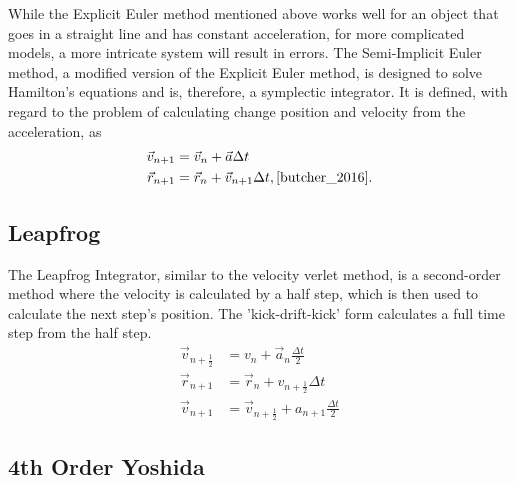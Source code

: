 While the Explicit Euler method mentioned above works well for an object that goes in a straight line and has constant acceleration, for more complicated models, a more intricate system will result in errors. The Semi-Implicit Euler method, a modified version of the Explicit Euler method, is designed to solve Hamilton's equations and is, therefore, a symplectic integrator. It is defined, with regard to the problem of calculating change position and velocity from the acceleration, as  
\begin{align*}
\vec{v}_{n+1}&=\vec{v}_n+\vec{a} \Delta t\\
\vec{r}_{n+1}&=\vec{r}_n+\vec{v}_{n+1} \Delta t, \cite{butcher_2016}.
\end{align*}

\subsection{Leapfrog}

The Leapfrog Integrator, similar to the velocity verlet method, is a second-order method where the velocity is calculated by a half step, which is then used to calculate the next step's position. The 'kick-drift-kick' form calculates a full time step from the half step.
\begin{align*}
\vec{v}_{n+\frac{1}{2}}&=v_n+\vec{a}_n \frac{\Delta t}{2}\\
\vec{r}_{n+1}&=\vec{r}_n+v_{n+\frac{1}{2}} \Delta t\\
\vec{v}_{n+1}&=\vec{v}_{n+\frac{1}{2}}+a_{n+1} \frac{\Delta t}{2}
\end{align*}

\subsection{4th Order Yoshida}

